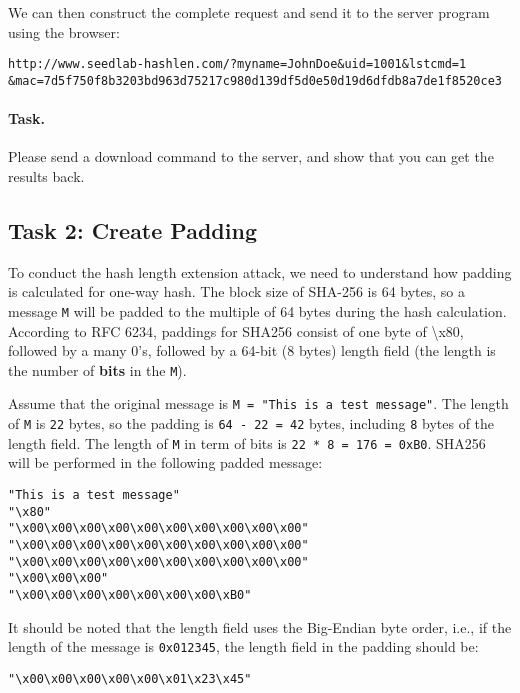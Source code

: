 We can then construct the complete request and send it to the server program using
the browser:

\begin{lstlisting}
http://www.seedlab-hashlen.com/?myname=JohnDoe&uid=1001&lstcmd=1
&mac=7d5f750f8b3203bd963d75217c980d139df5d0e50d19d6dfdb8a7de1f8520ce3 
\end{lstlisting}

\paragraph{Task.} Please send a download command to the server, and 
show that you can get the results back. 


\subsection{Task 2: Create Padding}

To conduct the hash length extension attack, we 
need to understand how padding is calculated for
one-way hash. The block size of SHA-256 is 64 bytes, so 
a message \texttt{M} will be padded to the multiple of 
64 bytes during the hash calculation. 
According to RFC 6234, paddings for SHA256 consist of one byte
of \textbackslash x80, followed by a many 0's, followed by a 
64-bit (8 bytes) length field (the length is the number 
of \textbf{bits} in the \texttt{M}). 

Assume that the original message is \texttt{M = "This is a test message"}. 
The length of \texttt{M} is \texttt{22} bytes, so the 
padding is \texttt{64 - 22 = 42} bytes, including \texttt{8} bytes of the length field.   
The length of \texttt{M} in term of bits
is \texttt{22 * 8 = 176 = 0xB0}.
SHA256 will be performed in the following padded 
message: 

\begin{lstlisting}
"This is a test message"
"\x80"
"\x00\x00\x00\x00\x00\x00\x00\x00\x00\x00"
"\x00\x00\x00\x00\x00\x00\x00\x00\x00\x00"
"\x00\x00\x00\x00\x00\x00\x00\x00\x00\x00"
"\x00\x00\x00"
"\x00\x00\x00\x00\x00\x00\x00\xB0"
\end{lstlisting}


It should be noted that 
the length field uses the Big-Endian byte order, i.e., 
if the length of the message is \texttt{0x012345}, 
the length field in the padding should be:
\begin{lstlisting}
"\x00\x00\x00\x00\x00\x01\x23\x45"
\end{lstlisting}


